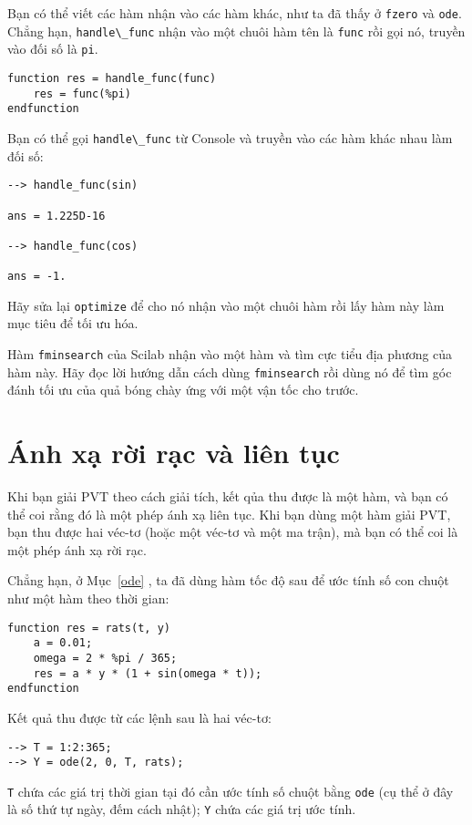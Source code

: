 \documentclass[12pt]{book}
\begin{document}
\begin{ex}
Bạn có thể viết các hàm nhận vào các hàm khác, như ta đã thấy  
ở {\tt fzero} và {\tt ode}. Chẳng hạn, \verb#handle\_func# nhận vào 
một chuôi hàm tên là {\tt func} rồi gọi nó, truyền vào đối số là  {\tt pi}.

\begin{verbatim}
function res = handle_func(func)
    res = func(%pi)
endfunction
\end{verbatim}
%
Bạn có thể gọi \verb#handle\_func# từ  Console và truyền
vào các  hàm khác nhau làm đối số:

\begin{verbatim}
--> handle_func(sin)

ans = 1.225D-16

--> handle_func(cos)

ans = -1.
\end{verbatim}
%
Hãy sửa lại  {\tt optimize} để cho nó nhận vào một chuôi hàm rồi 
lấy hàm này làm mục tiêu để tối ưu hóa.
\end{ex}

\begin{ex}
Hàm  {\tt fminsearch} của Scilab nhận vào một hàm và tìm 
cực tiểu địa phương của hàm này. Hãy đọc lời hướng dẫn cách dùng  
{\tt fminsearch} rồi dùng nó để tìm góc đánh tối ưu của quả bóng 
chày ứng với một  vận tốc cho trước. 
\end{ex}


\section{Ánh xạ rời rạc và liên tục }

Khi bạn giải PVT theo cách giải tích, kết qủa thu được là một hàm, 
và bạn có thể coi rằng đó là một phép ánh xạ liên tục. Khi bạn 
dùng một hàm giải PVT, bạn thu được hai véc-tơ (hoặc một véc-tơ 
và một ma trận), mà bạn có thể coi là một phép ánh xạ rời rạc.

Chẳng hạn, ở Mục~\ref{ode} , ta đã dùng hàm tốc độ sau để 
ước tính số con chuột như một hàm theo thời gian: 

\begin{verbatim}
function res = rats(t, y)
    a = 0.01;
    omega = 2 * %pi / 365;
    res = a * y * (1 + sin(omega * t));
endfunction
\end{verbatim}
%
Kết quả thu được từ các lệnh sau là hai véc-tơ:

\begin{verbatim}
--> T = 1:2:365;
--> Y = ode(2, 0, T, rats);
\end{verbatim}
%
{\tt T} chứa các giá trị thời gian tại đó cần ước tính số chuột bằng {\tt ode}
(cụ thể ở đây là số thứ tự ngày, đếm cách nhật); 
{\tt Y} chứa các giá trị ước tính.
\end{document}
